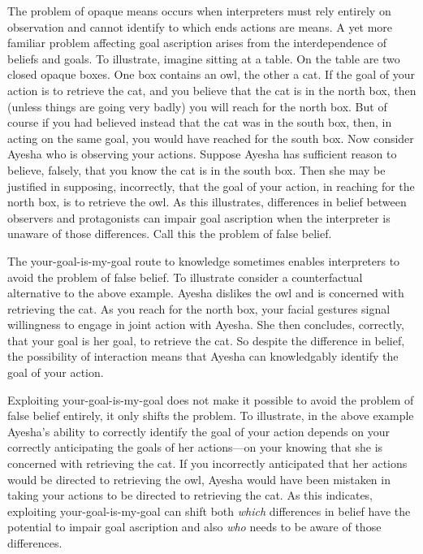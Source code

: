 \documentclass[14pt,a4paper]{extarticle}
\begin{document}
The problem of opaque means occurs when interpreters  must rely entirely on observation and cannot identify to which ends actions are means.
A yet more familiar problem affecting goal ascription 
arises from the interdependence of beliefs and goals.
To illustrate, 
imagine sitting at a table.
On the table are two closed opaque boxes.
One box contains an owl, the other a cat.
If the goal of your action is to retrieve the cat, 
and you believe that the cat is in the north box,
then 
(unless things are going very badly) 
you will reach for the north box.
But of course if you had believed instead that the cat was in the south box,
then, in acting on the same goal, you would have reached for the south box.
Now consider Ayesha who is observing your actions.
Suppose Ayesha has sufficient reason to believe, falsely, that you know the cat is in the south box.
Then she may be justified in supposing, incorrectly, that 
the goal of your action, in reaching for the north box,
is to retrieve the owl.
As this illustrates,
differences in belief between observers and protagonists can 
impair goal ascription
when the interpreter is unaware of those differences.
Call this the problem of false belief.

The your-goal-is-my-goal
route to knowledge
sometimes enables interpreters to avoid the problem of false belief.
To illustrate consider a counterfactual alternative to the above example.
Ayesha dislikes the owl and is concerned with retrieving the cat.
As you reach for the north box,
your facial gestures signal willingness to engage in joint action with Ayesha.
She then concludes, correctly, that your goal is her goal, to retrieve the cat.
So despite the difference in belief,
the possibility of interaction means that
Ayesha can knowledgably identify the goal of your action.

Exploiting your-goal-is-my-goal does not make it possible to  avoid the problem of false belief entirely,
it only shifts  the problem.
To illustrate,
in the above example Ayesha's ability to correctly identify the goal of your action
depends on your correctly anticipating the goals of her actions---on your knowing that she is concerned with retrieving the cat.
If you incorrectly anticipated that her actions would be directed to retrieving the owl,
Ayesha would have been mistaken in taking your actions to be directed to retrieving the cat.
As this indicates,
exploiting your-goal-is-my-goal 
can shift 
both 
\emph{which} differences in belief have the potential to impair  goal ascription
and also 
\emph{who} needs to be aware of those differences.
\end{document}

